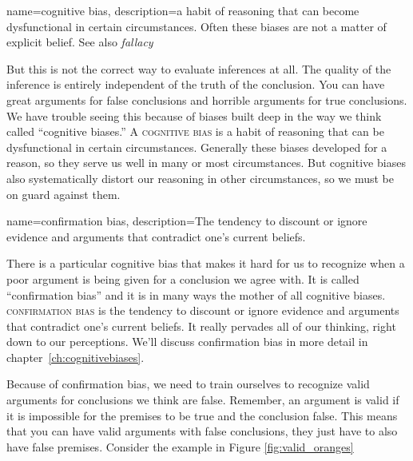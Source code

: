 

{
name=cognitive bias,
description={a habit of reasoning that can become dysfunctional in certain circumstances. Often these biases are not a matter of explicit belief. See also \emph{fallacy}}
}

But this is not the correct way to evaluate inferences at all. The quality of the inference is entirely independent of the truth of the conclusion. You can have great arguments for false conclusions and horrible arguments for true conclusions. We have trouble seeing this because of biases built deep in the way we think called ``cognitive biases.'' A  \textsc{\gls{cognitive bias}}\label{def:cognitive_bias} is a habit of reasoning that can be dysfunctional in certain circumstances. Generally these biases developed for a reason, so they serve us well in many or most circumstances. But cognitive biases also systematically distort our reasoning in other circumstances, so we must be on guard against them.

{
name=confirmation bias,
description={The tendency to discount or ignore evidence and arguments that contradict one's current beliefs.}
}

There is a particular cognitive bias that makes it hard for us to recognize when a poor argument is being given for a conclusion we agree with. It is called ``confirmation bias'' and it is in many ways the mother of all cognitive biases.  \textsc{\Gls{confirmation bias}} \label{def:confirmation_bias} is the tendency to discount or ignore evidence and arguments that contradict one's current beliefs. It really pervades all of our thinking, right down to our perceptions. We'll discuss confirmation bias in more detail in chapter~\ref{ch:cognitivebiases}.

Because of confirmation bias, we need to train ourselves to recognize valid arguments for conclusions we think are false. Remember, an argument is valid if it is impossible for the premises to be true and the conclusion false. This means that you can have valid arguments with false conclusions, they just have to also have false premises. Consider the example in Figure \ref{fig:valid_oranges}


\begin{kormanize}
\end{kormanize}


